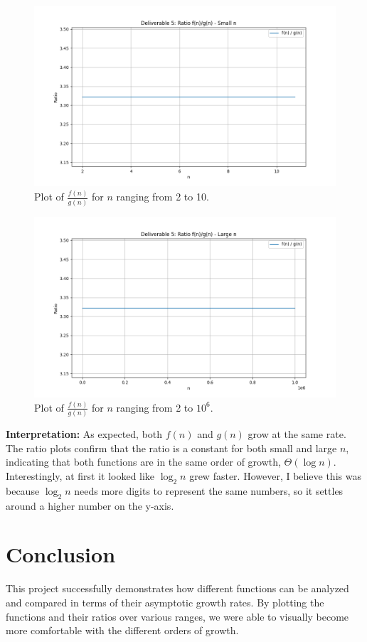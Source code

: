 \documentclass{article}
\begin{document}
\begin{figure}[H]
    \centering
    \includegraphics[width=\textwidth]{plot_deliverable5_ratio_smalln.png}
    \caption{Plot of $\frac{f(n)}{g(n)}$ for $n$ ranging from 2 to 10.}
    \label{fig:ratio_fn4_gn4_2_10}
\end{figure}

\begin{figure}[H]
    \centering
    \includegraphics[width=\textwidth]{plot_deliverable5_ratio_largen.png}
    \caption{Plot of $\frac{f(n)}{g(n)}$ for $n$ ranging from 2 to $10^6$.}
    \label{fig:ratio_fn4_gn4_2_10e6}
\end{figure}

\textbf{Interpretation:} As expected, both $f(n)$ and $g(n)$ grow at the same rate. The ratio plots confirm that the ratio is a constant for both small and large $n$, indicating that both functions are in the same order of growth, $\Theta(\log n)$. Interestingly, at first it looked like $\log_2 n$ grew faster. However, I believe this was because $\log_2 n$ needs more digits to represent the same numbers, so it settles around a higher number on the y-axis.

\section{Conclusion}

This project successfully demonstrates how different functions can be analyzed and compared in terms of their asymptotic growth rates. By plotting the functions and their ratios over various ranges, we were able to visually become more comfortable with the different orders of growth.
\end{document}
